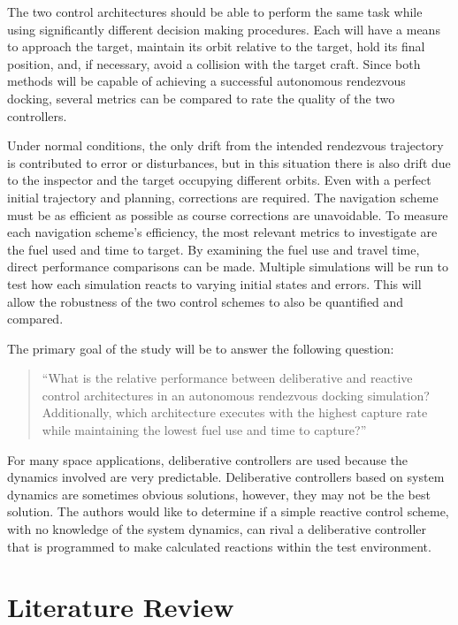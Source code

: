 \documentclass[journal, 10pt]{IEEEtran}
\begin{document}
The two control architectures should be able to perform the same task while using significantly different decision making procedures.  Each will have a means to approach the target, maintain its orbit relative to the target, hold its final position, and, if necessary, avoid a collision with the target craft.  Since both methods will be capable of achieving a successful autonomous rendezvous docking, several metrics can be compared to rate the quality of the two controllers.

Under normal conditions, the only drift from the intended rendezvous trajectory is contributed to error or disturbances, but in this situation there is also drift due to the inspector and the target occupying different orbits.  Even with a perfect initial trajectory and planning, corrections are required.  The navigation scheme must be as efficient as possible as course corrections are unavoidable. To measure each navigation scheme's efficiency, the most relevant metrics to investigate are the fuel used and time to target.  By examining the fuel use and travel time, direct performance comparisons can be made.  Multiple simulations will be run to test how each simulation reacts to varying initial states and errors.  This will allow the robustness of the two control schemes to also be quantified and compared.

The primary goal of the study will be to answer the following question:

\begin{quote}
``What is the relative performance between deliberative and reactive control architectures in an autonomous rendezvous docking simulation? Additionally, which architecture executes with the highest capture rate while maintaining the lowest fuel use and time to capture?''
\end{quote}

For many space applications, deliberative controllers are used because the dynamics involved are very predictable. Deliberative controllers based on system dynamics are sometimes obvious solutions, however, they may not be the best solution.  The authors would like to determine if a simple reactive control scheme, with no knowledge of the system dynamics, can rival a deliberative controller that is programmed to make calculated reactions within the test environment.

\section{Literature Review}
\end{document}
